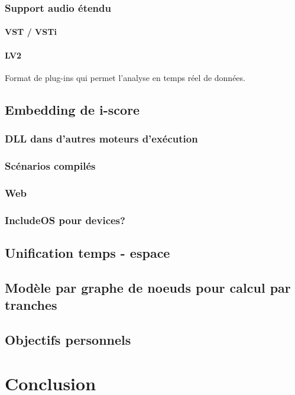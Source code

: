 \documentclass[french,a4paper]{book}
\begin{document}
\subsection{Support audio étendu}
\subsubsection{VST / VSTi}
\subsubsection{LV2}
Format de plug-ins qui permet l'analyse en temps réel de données.

\section{Embedding de i-score}
\subsection{DLL dans d'autres moteurs d'exécution}
\subsection{Scénarios compilés}
\subsection{Web}
\subsection{IncludeOS pour devices?}

\section{Unification temps - espace}
\section{Modèle par graphe de noeuds pour calcul par tranches}
\section{Objectifs personnels}
\chapter{Conclusion}
\end{document}
